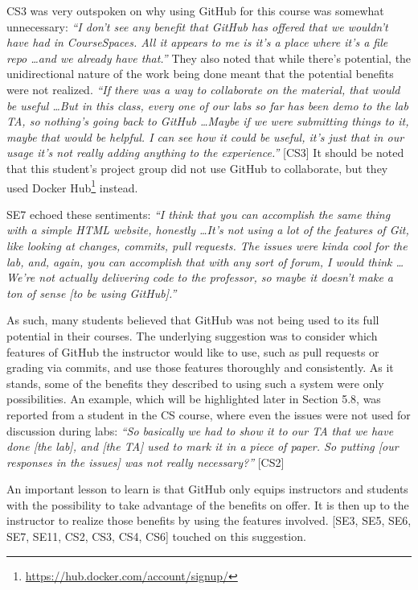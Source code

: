 CS3 was very outspoken on why using GitHub for this course was somewhat unnecessary: \textit{``I don't see any benefit that GitHub has offered that we wouldn't have had in CourseSpaces. All it appears to me is it's a place where it's a file repo \ldots and we already have that.''} They also noted that while there's potential, the unidirectional nature of the work being done meant that the potential benefits were not realized. \textit{``If there was a way to collaborate on the material, that would be useful \ldots But in this class, every one of our labs so far has been demo to the lab TA, so nothing's going back to GitHub \ldots Maybe if we were submitting things to it, maybe that would be helpful. I can see how it could be useful, it's just that in our usage it's not really adding anything to the experience.''} [CS3] It should be noted that this student's project group did not use GitHub to collaborate, but they used Docker Hub\footnote{\url{https://hub.docker.com/account/signup/}} instead.

SE7 echoed these sentiments: \textit{``I think that you can accomplish the same thing with a simple HTML website, honestly \ldots It's not using a lot of the features of Git, like looking at changes, commits, pull requests. The issues were kinda cool for the lab, and, again, you can accomplish that with any sort of forum, I would think \ldots We're not actually delivering code to the professor, so maybe it doesn't make a ton of sense [to be using GitHub].''}

As such, many students believed that GitHub was not being used to its full potential in their courses. The underlying suggestion was to consider which features of GitHub the instructor would like to use, such as pull requests or grading via commits, and use those features thoroughly and consistently. As it stands, some of the benefits they described to using such a system were only possibilities. An example, which will be highlighted later in Section 5.8, was reported from a student in the CS course, where even the issues were not used for discussion during labs: \textit{``So basically we had to show it to our TA that we have done [the lab], and [the TA] used to mark it in a piece of paper. So putting [our responses in the issues] was not really necessary?''} [CS2]

An important lesson to learn is that GitHub only equips instructors and students with the possibility to take advantage of the benefits on offer. It is then up to the instructor to realize those benefits by using the features involved. [SE3, SE5, SE6, SE7, SE11, CS2, CS3, CS4, CS6] touched on this suggestion. \\

